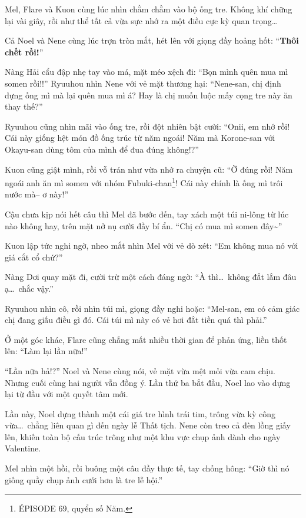 \documentclass[../main.tex]{subfiles}
\begin{document}
Mel, Flare và Kuon cùng lúc nhìn chằm chằm vào bộ ống tre. Không khí chững lại vài giây, rồi như thể tất cả vừa sực nhớ ra một điều cực kỳ quan trọng\dots

Cả Noel và Nene cùng lúc trợn tròn mắt, hét lên với giọng đầy hoảng hốt: ``\textbf{Thôi chết rồi!}''

Nàng Hải cẩu đập nhẹ tay vào má, mặt méo xệch đi: ``Bọn mình quên mua mì somen rồi!!'' Ryuuhou nhìn Nene với vẻ mặt thương hại: ``Nene-san, chị định dựng ống mì mà lại quên mua mì á? Hay là chị muốn luộc mấy cọng tre này ăn thay thế?''

Ryuuhou cũng nhìn mãi vào ống tre, rồi đột nhiên bật cười: ``Onii, em nhớ rồi! Cái này giống hệt món đồ ống trúc từ năm ngoái! Năm mà Korone-san với Okayu-san dùng tôm của mình để đua đúng không!?''

Kuon cũng giật mình, rồi vỗ trán như vừa nhớ ra chuyện cũ: ``Ờ đúng rồi! Năm ngoái anh ăn mì somen với nhóm Fubuki-chan\footnote{{\flaregothic ÉPISODE 69}, quyển số Năm.}! Cái này chính là ống mì trôi nước mà-- ơ này!''

Cậu chưa kịp nói hết câu thì Mel đã bước đến, tay xách một túi ni-lông từ lúc nào không hay, trên mặt nở nụ cười đầy bí ẩn. ``Chị có mua mì somen đây\~{}''

Kuon lập tức nghi ngờ, nheo mắt nhìn Mel với vẻ dò xét: ``Em không mua nó với giá cắt cổ chứ?''

Nàng Dơi quay mặt đi, cười trừ một cách đáng ngờ: ``À thì\dots\ không đắt lắm đâu ạ\dots\ chắc vậy.''

Ryuuhou nhìn cô, rồi nhìn túi mì, giọng đầy nghi hoặc: ``Mel-san, em có cảm giác chị đang giấu điều gì đó. Cái túi mì này có vẻ hơi đắt tiền quá thì phải.''

Ở một góc khác, Flare cũng chẳng mất nhiều thời gian để phản ứng, liền thốt lên: ``Làm lại lần nữa!''

``Lần nữa hả!?'' Noel và Nene cùng nói, vẻ mặt vừa mệt mỏi vừa cam chịu. Nhưng cuối cùng hai người vẫn đồng ý. Lần thứ ba bắt đầu, Noel lao vào dựng lại từ đầu với một quyết tâm mới.

Lần này, Noel dựng thành một cái giá tre hình trái tim, trông vừa kỳ công vừa\dots\ chẳng liên quan gì đến ngày lễ Thất tịch. Nene còn treo cả đèn lồng giấy lên, khiến toàn bộ cấu trúc trông như một khu vực chụp ảnh dành cho ngày Valentine.

Mel nhìn một hồi, rồi buông một câu đầy thực tế, tay chống hông: ``Giờ thì nó giống quầy chụp ảnh cưới hơn là tre lễ hội.''
\end{document}
